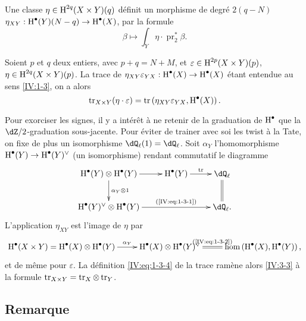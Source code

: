 \subsection{}\label{IV:3-2}

Une classe $\eta\in \operatorname{H}^{2 q}(X\times Y)(q)$ définit un morphisme de degré 
$2(q-N)$ $\eta_{XY}:\operatorname{H}^\bullet(Y)(N-q)\to \operatorname{H}^\bullet(X)$, par la formule 
\[
  \beta \mapsto \int_Y \eta\cdot \operatorname{pr}_2^\ast \beta \text{.}
\]





\begin{proposition_}\label{IV:3-3}
Soient $p$ et $q$ deux entiers, avec $p+q=N+M$, et 
$\varepsilon\in \operatorname{H}^{2 p}(X\times Y)(p)$, $\eta\in \operatorname{H}^{2 q}(X\times Y)(p)$. La 
trace de $\eta_{X Y}\varepsilon_{Y X}:\operatorname{H}^\bullet(X)\to \operatorname{H}^\bullet(X)$ étant 
entendue au sens \ref{IV:1-3}, on a alors 
\[
  \operatorname{tr}_{X\times Y}(\eta\cdot \varepsilon) = \operatorname{tr}\left(\eta_{X Y}\varepsilon_{Y X},\operatorname{H}^\bullet(X)\right) \text{.}
\]
\end{proposition_}

Pour exorciser les signes, il y a intérêt à ne retenir de la graduation 
de $\operatorname{H}^\bullet$ que la $\dZ/2$-graduation sous-jacente. Pour éviter de 
trainer avec soi les twist à la Tate, on fixe de plus un isomorphisme 
$\dQ_\ell(1)=\dQ_\ell$. Soit $\alpha_Y$ l'homomorphisme 
$\operatorname{H}^\bullet(Y)\to \operatorname{H}^\bullet(Y)^\vee$ (un isomorphisme) rendant commutatif le 
diagramme 
\[\xymatrix{
  \h^\bullet(Y)\otimes \h^\bullet(Y) \ar[r] \ar[d]^-{\alpha_Y\otimes 1} 
    & \h^\bullet(Y) \ar[r]^-{\tr} 
    & \dQ_\ell \ar@{=}[d] \\
  \h^\bullet(Y)^\vee \otimes \h^\bullet(Y) \ar[rr]^-{\text{(\ref{IV:eq:1-3-1})}} 
    & & \dQ_\ell \text{.}
}\]
L'application $\eta_{X Y}$ est l'image de $\eta$ par 
\[\xymatrix{
  \h^\bullet(X\times Y) = \h^\bullet(X)\otimes \h^\bullet(Y) \ar[r]^-{\alpha_Y} 
    & \h^\bullet(X) \otimes \h^\bullet(Y)^\vee \ar@{=}[r]^-{\text{(\ref{IV:eq:1-3-2})}} 
    & \hom\left(\h^\bullet(X),\h^\bullet(Y)\right) \text{,}
}\]
et de même pour $\varepsilon$. La définition \ref{IV:eq:1-3-4} de la trace 
ramène alors \ref{IV:3-3} à la formule 
$\operatorname{tr}_{X\times Y}=\operatorname{tr}_X\otimes \operatorname{tr}_Y$. 





\subsection{Remarque}\label{IV:3-4}

